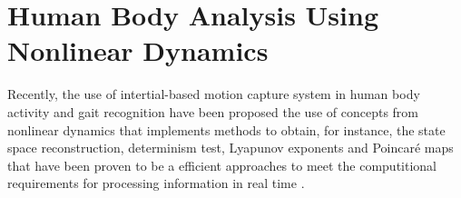 % 
% 
% 
% 
% 
% 
% 
% 
% 



\section{Human Body Analysis Using Nonlinear Dynamics}

Recently, the use of intertial-based motion capture system in human body activity 
and gait recognition have been proposed the use of concepts from nonlinear dynamics 
that implements methods to obtain, for instance, the state space reconstruction,
determinism test, Lyapunov exponents and Poincar\'e maps that have been proven 
to be a efficient approaches to meet the computitional requirements for processing 
information in real time
\cite{J.FrankS.Mannor2010, Sama2013, Gouwanda2012,Perc2005, Akiduki2013,Akiduki2014}. 

